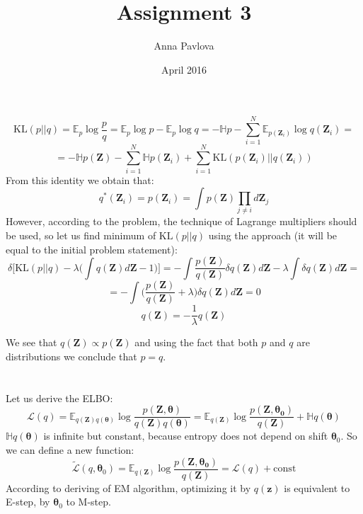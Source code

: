 \documentclass{article}
\title{\textbf{Assignment 3}}
\author{Anna Pavlova}
\date{April 2016}
\begin{document}
\maketitle

\section{}
$$\mathrm{KL}(p||q)=\mathbb{E}_p\log\frac{p}{q} = \mathbb{E}_p\log p - \mathbb{E}_p \log q = -\mathbb{H}p - \sum_{i=1}^N\mathbb{E}_{p(\mathbf{Z}_i)}\log q(\mathbf{Z}_i) = $$ $$= -\mathbb{H}p(\mathbf{Z}) - \sum_{i=1}^N\mathbb{H}p(\mathbf{Z}_i) + \sum_{i=1}^N\mathrm{KL}(p(\mathbf{Z}_i)||q(\mathbf{Z}_i))$$
From this identity we obtain that:
$$q^{*}(\mathbf{Z}_i) = p(\mathbf{Z}_i) = \int p(\mathbf{Z})\prod_{j \neq i}d\mathbf{Z}_j$$
However, according to the problem, the technique of Lagrange multipliers should be used, so let us find minimum of $\mathrm{KL}(p||q)$ using the approach (it will be equal to the initial problem statement):
$$\delta \Big[ \mathrm{KL}(p||q) - \lambda \Big(\int q(\mathbf{Z}) d\mathbf{Z} - 1\Big) \Big] = -\int \frac{p(\mathbf{Z})}{q(\mathbf{Z})} \delta q(\mathbf{Z})d\mathbf{Z} - \lambda \int \delta q(\mathbf{Z})d\mathbf{Z} = $$
$$= -\int \Big(\frac{p(\mathbf{Z})}{q(\mathbf{Z})} + \lambda\Big) \delta q(\mathbf{Z})d\mathbf{Z} = 0$$
$$q(\mathbf{Z}) = -\frac{1}{\lambda}q(\mathbf{Z})$$

We see that $q(\mathbf{Z}) \propto p(\mathbf{Z})$ and using the fact that both $p$ and $q$ are distributions we conclude that $p = q$.

\section{}
Let us derive the ELBO:
$$\mathcal{L}(q) = \mathbb{E}_{q(\mathbf{Z})q(\pmb{\theta})} \log \frac{p(\mathbf{Z}, \pmb{\theta})}{q(\mathbf{Z})q(\mathbf{\theta})} = \mathbb{E}_{q(\mathbf{Z})} \log \frac{p(\mathbf{Z}, \mathbf{\pmb\theta_0})}{q(\mathbf{Z})} + \mathbb{H}q(\pmb\theta)$$
$\mathbb{H}q(\pmb\theta)$ is infinite but constant, because entropy does not depend on shift $\pmb\theta_0$. So we can define a new function:
$$\mathcal{\tilde{L}}(q, \pmb\theta_0) = \mathbb{E}_{q(\mathbf{Z})} \log \frac{p(\mathbf{Z}, \mathbf{\pmb\theta_0})}{q(\mathbf{Z})} = \mathcal{L}(q) + \mathrm{const}$$
According to deriving of EM algorithm, optimizing it by $q(\pmb z)$ is equivalent to E-step, by $\pmb\theta_0$ to M-step.  
\end{document}
